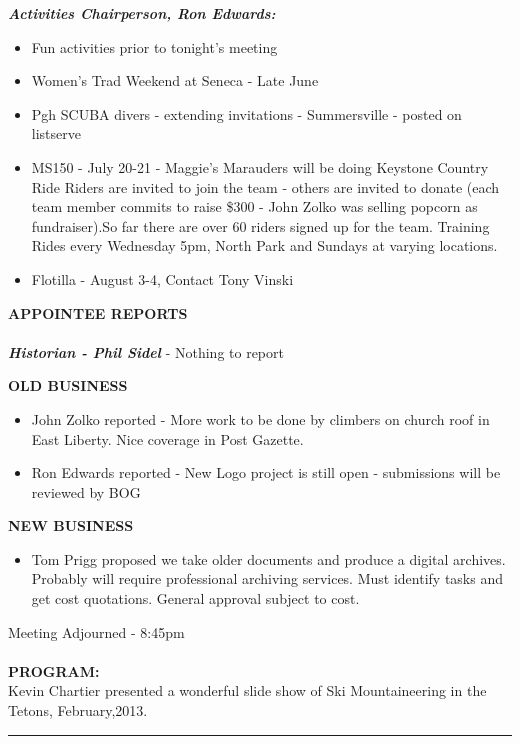 \documentclass[10pt,a4paper]{article}
\begin{document}
\begin{multicols}{2}
\textit{\textbf{Activities Chairperson, Ron Edwards:}}
	\begin{itemize}
\item   Fun activities prior to tonight's meeting
\item   Women's Trad Weekend at Seneca - Late June
\item   Pgh SCUBA divers - extending invitations - Summersville - posted on listserve
\item    MS150 - July 20-21 - Maggie's Marauders will be doing Keystone Country Ride
	Riders are invited to join the team - others are invited to donate (each team 
	member commits to raise \$300 - John Zolko was selling popcorn as fundraiser).So far there are over 60 riders signed up for the team. 	Training Rides every Wednesday 5pm, North Park and Sundays at varying locations.  
\item   Flotilla - August 3-4, Contact Tony Vinski
	\end{itemize}


\textbf{APPOINTEE REPORTS}
\\
\\
 \textit{  \textbf{Historian - Phil Sidel}} - Nothing to report
   
\textbf{OLD BUSINESS}
\begin{itemize}
\item    John Zolko reported -	More work to be done by climbers on church roof in East Liberty. 	Nice coverage in Post Gazette. 
\item    Ron Edwards reported - 	New Logo project is still open - submissions will be reviewed by BOG
\end{itemize}
 
\textbf{NEW BUSINESS}
\begin{itemize}
\item    Tom Prigg proposed we take older documents and produce a digital archives.  	Probably will require professional archiving services.    	Must  identify tasks and get cost quotations. General approval subject to cost.  
\end{itemize}

Meeting Adjourned - 8:45pm\\
\\
\textbf{PROGRAM:}\\
    Kevin Chartier presented a wonderful slide show of Ski Mountaineering in the Tetons, February,2013.  

\end{multicols}

\hrule 
\end{document}
